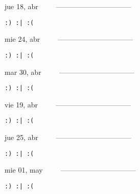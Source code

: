 \documentclass[letterpaper,10pt]{article}
\begin{document}
\begin{multicols}{3}
{jue 18, abr\ \ \ \ \ --------------------------------}
\begin{flushright}\begin{small}\texttt{:) :| :(}\end{small}\end{flushright}
\vfill
{mie 24, abr\ \ \ \ \ --------------------------------}
\begin{flushright}\begin{small}\texttt{:) :| :(}\end{small}\end{flushright}\par
\vfill
{mar 30, abr\ \ \ \ \ --------------------------------}
\begin{flushright}\begin{small}\texttt{:) :| :(}\end{small}\end{flushright}\par
\vfill
\end{multicols}
\vspace{1.05cm}

\begin{multicols}{3}
{vie 19, abr\ \ \ \ \ --------------------------------}
\begin{flushright}\begin{small}\texttt{:) :| :(}\end{small}\end{flushright}
\vfill
{jue 25, abr\ \ \ \ \ --------------------------------}
\begin{flushright}\begin{small}\texttt{:) :| :(}\end{small}\end{flushright}\par
\vfill
{mie 01, may\ \ \ \ \ --------------------------------}
\begin{flushright}\begin{small}\texttt{:) :| :(}\end{small}\end{flushright}\par
\vfill
\end{multicols}
\vspace{1.05cm}
\end{document}
